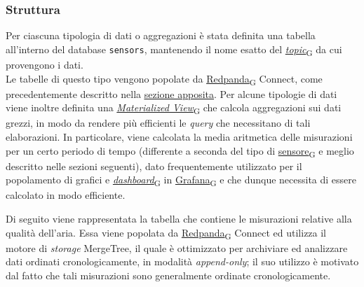 \subsubsection{Struttura}
Per ciascuna tipologia di dati o aggregazioni è stata definita una tabella all'interno del database \texttt{sensors}, mantenendo il nome esatto del \href{https://7last.github.io/docs/pb/documentazione-interna/glossario\#topic}{\textit{topic}\textsubscript{G}}
da cui provengono i dati.\\
Le tabelle di questo tipo vengono popolate da \href{https://7last.github.io/docs/pb/documentazione-interna/glossario\#redpanda}{Redpanda\textsubscript{G}} Connect, come precedentemente descritto nella \hyperref[redpanda_connect]{\underline{sezione apposita}}.
Per alcune tipologie di dati viene inoltre definita una \href{https://7last.github.io/docs/pb/documentazione-interna/glossario\#materialized-view}{\textit{Materialized View}\textsubscript{G}} che calcola aggregazioni sui dati grezzi,
in modo da rendere più efficienti le \textit{query} che necessitano di tali elaborazioni.
In particolare, viene calcolata la media aritmetica delle misurazioni per un certo periodo di tempo (differente a seconda del tipo di \href{https://7last.github.io/docs/pb/documentazione-interna/glossario\#sensore}{sensore\textsubscript{G}} e meglio descritto nelle sezioni seguenti),
dato frequentemente utilizzato per il popolamento di grafici e \href{https://7last.github.io/docs/pb/documentazione-interna/glossario\#dashboard}{\textit{dashboard}\textsubscript{G}} in \href{https://7last.github.io/docs/pb/documentazione-interna/glossario\#grafana}{Grafana\textsubscript{G}} e che dunque necessita di essere calcolato in modo efficiente.

Di seguito viene rappresentata la tabella che contiene le misurazioni relative alla qualità dell'aria. Essa viene popolata da \href{https://7last.github.io/docs/pb/documentazione-interna/glossario\#redpanda}{Redpanda\textsubscript{G}} Connect ed utilizza il motore di \textit{storage}
MergeTree, il quale è ottimizzato per archiviare ed analizzare dati ordinati cronologicamente, in modalità \textit{append-only}; il suo
utilizzo è motivato dal fatto che tali misurazioni sono generalmente ordinate cronologicamente.


